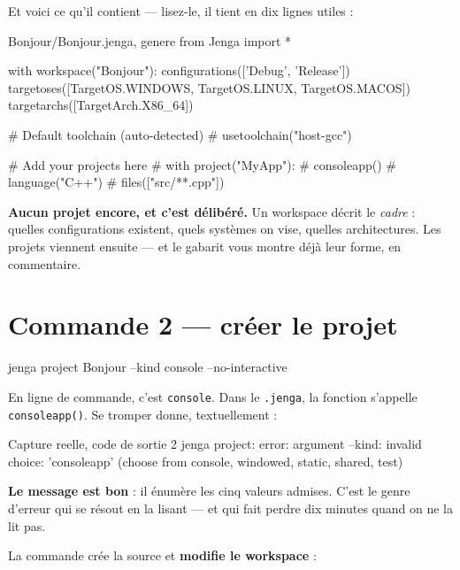 Et voici ce qu'il contient --- lisez-le, il tient en dix lignes utiles :

\begin{nkcode}{Bonjour/Bonjour.jenga, genere}
from Jenga import *

with workspace("Bonjour"):
    configurations(['Debug', 'Release'])
    targetoses([TargetOS.WINDOWS, TargetOS.LINUX, TargetOS.MACOS])
    targetarchs([TargetArch.X86_64])

    # Default toolchain (auto-detected)
    # usetoolchain("host-gcc")

    # Add your projects here
    # with project("MyApp"):
    #     consoleapp()
    #     language("C++")
    #     files(["src/**.cpp"])
\end{nkcode}

\begin{nkretenir}
\textbf{Aucun projet encore, et c'est délibéré.} Un workspace décrit le
\emph{cadre} : quelles configurations existent, quels systèmes on vise, quelles
architectures. Les projets viennent ensuite --- et le gabarit vous montre déjà
leur forme, en commentaire.
\end{nkretenir}

\section{Commande 2 --- créer le projet}

\begin{nkcode}{}
jenga project Bonjour --kind console --no-interactive
\end{nkcode}

\begin{nkpiege}
En ligne de commande, c'est \texttt{console}. Dans le \texttt{.jenga}, la
fonction s'appelle \texttt{consoleapp()}. Se tromper donne, textuellement :

\begin{nkcode}{Capture reelle, code de sortie 2}
jenga project: error: argument --kind: invalid choice: 'consoleapp'
(choose from console, windowed, static, shared, test)
\end{nkcode}

\textbf{Le message est bon} : il énumère les cinq valeurs admises. C'est le
genre d'erreur qui se résout en la lisant --- et qui fait perdre dix minutes
quand on ne la lit pas.
\end{nkpiege}

La commande crée la source et \textbf{modifie le workspace} :

